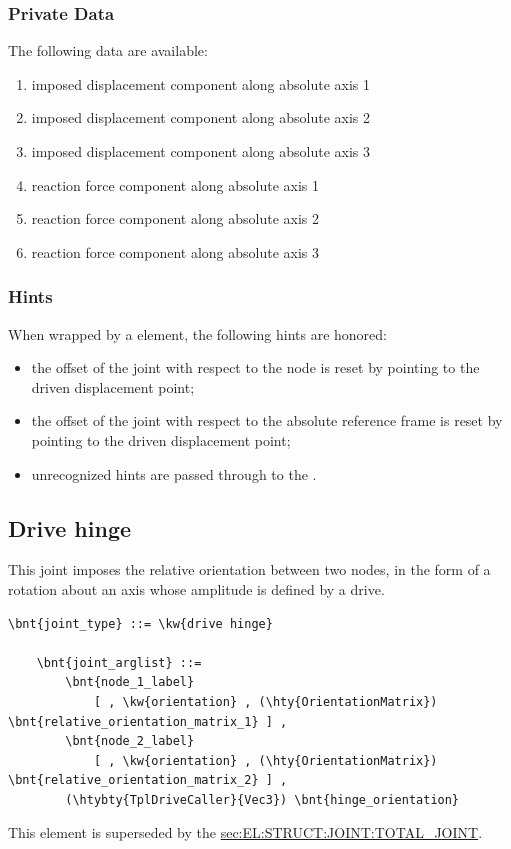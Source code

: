 \subsubsection{Private Data}
The following data are available:
\begin{enumerate}
\item {} imposed displacement component along absolute axis 1
\item {} imposed displacement component along absolute axis 2
\item {} imposed displacement component along absolute axis 3
\item {} reaction force component along absolute axis 1
\item {} reaction force component along absolute axis 2
\item {} reaction force component along absolute axis 3
\end{enumerate}

\subsubsection{Hints}
When wrapped by a  element, the following hints are honored:
\begin{itemize}
\item {} the offset of the joint
with respect to the node is reset by pointing 
to the driven displacement point;
\item {} the offset of the joint
with respect to the absolute reference frame is reset by pointing
to the driven displacement point;
\item unrecognized hints are passed through to the .
\end{itemize}



\subsection{Drive hinge}
\label{sec:EL:JOINT:DRIVEHINGE}
This joint imposes the relative orientation between two nodes,
in the form of a rotation about an axis whose amplitude is defined
by a drive.
\begin{Verbatim}[commandchars=\\\{\}]
    \bnt{joint_type} ::= \kw{drive hinge}

    \bnt{joint_arglist} ::= 
        \bnt{node_1_label}
            [ , \kw{orientation} , (\hty{OrientationMatrix}) \bnt{relative_orientation_matrix_1} ] ,
        \bnt{node_2_label}
            [ , \kw{orientation} , (\hty{OrientationMatrix}) \bnt{relative_orientation_matrix_2} ] ,
        (\htybty{TplDriveCaller}{Vec3}) \bnt{hinge_orientation}
\end{Verbatim}
This element is superseded by the
\hyperref{\kw{total joint}}{\kw{total joint}, see Section~}{}{sec:EL:STRUCT:JOINT:TOTAL_JOINT}.


